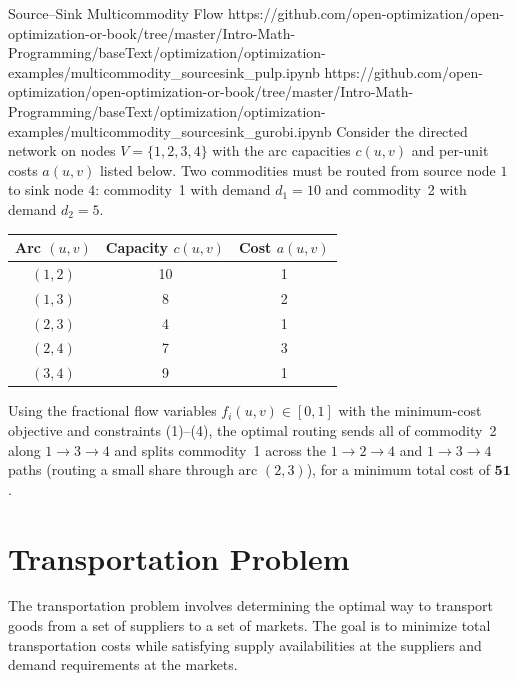 \begin{examplewithallcode}{Source--Sink Multicommodity Flow}
{}
{https://github.com/open-optimization/open-optimization-or-book/tree/master/Intro-Math-Programming/baseText/optimization/optimization-examples/multicommodity_sourcesink_pulp.ipynb}
{https://github.com/open-optimization/open-optimization-or-book/tree/master/Intro-Math-Programming/baseText/optimization/optimization-examples/multicommodity_sourcesink_gurobi.ipynb}
Consider the directed network on nodes \(V=\{1,2,3,4\}\) with the arc capacities \(c(u,v)\) and per-unit costs \(a(u,v)\) listed below. Two commodities must be routed from source node \(1\) to sink node \(4\): commodity~1 with demand \(d_1=10\) and commodity~2 with demand \(d_2=5\).

\begin{center}
\begin{tabular}{c|c|c}
Arc \((u,v)\) & Capacity \(c(u,v)\) & Cost \(a(u,v)\) \\
\hline
\((1,2)\) & 10 & 1 \\
\((1,3)\) &  8 & 2 \\
\((2,3)\) &  4 & 1 \\
\((2,4)\) &  7 & 3 \\
\((3,4)\) &  9 & 1 \\
\end{tabular}
\par{}\label{tab:modeling-sums-continued-tab03}%

\end{center}

Using the fractional flow variables \(f_i(u,v)\in[0,1]\) with the minimum-cost objective and constraints (1)--(4), the optimal routing sends all of commodity~2 along \(1\to 3\to 4\) and splits commodity~1 across the \(1\to 2\to 4\) and \(1\to 3\to 4\) paths (routing a small share through arc \((2,3)\)), for a minimum total cost of \(\mathbf{51}\).
\end{examplewithallcode}

\section{Transportation Problem}
\label{sec:transportation-problem}

The transportation problem involves determining the optimal way to transport goods from a set of suppliers to a set of markets. The goal is to minimize total transportation costs while satisfying supply availabilities at the suppliers and demand requirements at the markets.

